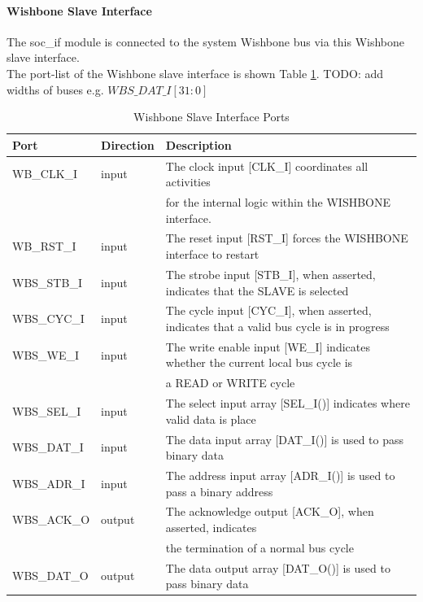 \paragraph{Wishbone Slave Interface}
The soc\_if module is connected to the system Wishbone bus via this Wishbone slave interface. \\
The port-list of the Wishbone slave interface is shown Table \ref{tab:socif_northbound}.
TODO: add widths of buses e.g. $WBS\_DAT\_I[31:0]$
\begin{table}[hbt]
\caption{Wishbone Slave Interface Ports}
\begin{tabular}{|l|l|l|}
\toprule
Port  & Direction & Description  \\
\midrule
	\hline WB\_CLK\_I & input & The clock input [CLK\_I] coordinates all activities \\  & & for the internal logic within the
WISHBONE interface.\\
	\hline WB\_RST\_I & input & The reset input [RST\_I] forces the WISHBONE interface to restart\\
	\hline WBS\_STB\_I & input & The strobe input [STB\_I], when asserted, indicates that the SLAVE is selected\\
	\hline WBS\_CYC\_I & input & The cycle input [CYC\_I], when asserted, indicates that a valid bus cycle is in progress\\
	\hline WBS\_WE\_I & input & The write enable input [WE\_I] indicates whether the current local bus cycle is  \\  & & a READ or
WRITE cycle\\
	\hline WBS\_SEL\_I & input & The select input array [SEL\_I()] indicates where valid data is place\\
	\hline WBS\_DAT\_I& input & The data input array [DAT\_I()] is used to pass binary data\\
	\hline WBS\_ADR\_I & input & The address input array [ADR\_I()] is used to pass a binary address \\
	\hline WBS\_ACK\_O & output & The acknowledge output [ACK\_O], when asserted, indicates  \\  & &  the termination of a normal
bus cycle\\
	\hline WBS\_DAT\_O & output & The data output array [DAT\_O()] is used to pass binary data\\
\bottomrule
\end{tabular}
\label{tab:socif_northbound}
\end{table}

